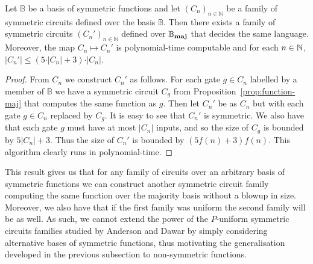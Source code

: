 \documentclass[../paper.tex]{subfiles}
\begin{document}
\begin{thm}
  Let $\mathbb{B}$ be a basis of symmetric functions and let $(C_n)_{n \in
    \mathbb{N}}$ be a family of symmetric circuits defined over the basis
  $\mathbb{B}$. Then there exists a family of symmetric circuits $(C_n')_{n \in
    \mathbb{N}}$ defined over $\mathbb{B}_{\text{\textbf{maj}}}$ that decides the same language.
  Moreover, the map $C_n \mapsto C_n'$ is polynomial-time computable and for
  each $n \in \mathbb{N}$, $\vert C_n' \vert \leq (5 \cdot \vert C_n \vert + 3) \cdot
  \vert C_n \vert$.
\end{thm}

\begin{proof}
  From $C_n$ we construct $C_n'$ as follows. For each gate $g \in C_n$ labelled
  by a member of $\mathbb{B}$ we have a symmetric circuit $C_g$ from
  Proposition~\ref{prop:function-maj} that computes the same function as $g$.
  Then let $C_n'$ be as $C_n$ but with each gate $g \in C_n$ replaced by $C_g$.
  It is easy to see that $C_n'$ is symmetric. We also have that each gate $g$
  must have at most $\vert C_n \vert$ inputs, and so the size of $C_g$ is
  bounded by $5 \vert C_n \vert + 3$. Thus the size of $C_n'$ is bounded by
  $(5f(n)+3) f(n)$. This algorithm clearly runs in polynomial-time.
\end{proof}

This result gives us that for any family of circuits over an arbitrary basis of
symmetric functions we can construct another symmetric circuit family computing
the same function over the majority basis without a blowup in size. Moreover, we
also have that if the first family was uniform the second family will be as
well. As such, we cannot extend the power of the $P$-uniform symmetric circuits
families studied by Anderson and Dawar \cite{AndersonD17} by simply considering
alternative bases of symmetric functions, thus motivating the generalisation
developed in the previous subsection to non-symmetric functions.
\end{document}
